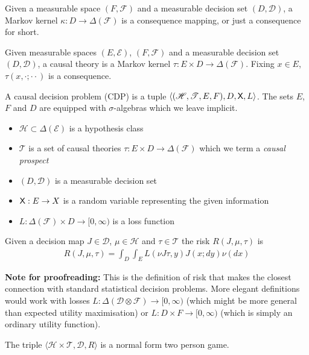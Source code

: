 \begin{definition}[Consequences]
Given a measurable space $(F,\mathcal{F})$ and a measurable decision set $(D,\mathcal{D})$, a Markov kernel $\kappa:D \to \Delta(\mathcal{F})$ is a consequence mapping, or just a consequence for short.
\end{definition}

\begin{definition}\label{def:causal_theory}
Given measurable spaces $(E,\mathcal{E})$, $(F,\mathcal{F})$ and a measurable decision set $(D,\mathcal{D})$, a causal theory is a Markov kernel $\tau:E\times D \to \Delta(\mathcal{F})$. Fixing $x\in E$, $\tau(x,\cdot;\cdot\cdot)$ is a consequence.
\end{definition}

\begin{definition}
A causal decision problem (CDP) is a tuple $\langle (\mathscr{H}, \mathscr{T}, E, F), D, \mathsf{X}, L \rangle$. The sets $E$, $F$ and $D$ are equipped with $\sigma$-algebras which we leave implicit.

\begin{itemize}
    \item $\mathscr{H}\subset \Delta(\mathcal{E})$ is a hypothesis class
    \item $\mathscr{T}$ is a set of causal theories $\tau:E\times D\to \Delta(\mathcal{F})$ which we term a \emph{causal prospect}
    \item $(D,\mathcal{D})$ is a measurable decision set
    \item $\mathsf{X}:E\to X$ is a random variable representing the given information
    \item $L:\Delta(\mathcal{F})\times D\to [0,\infty)$ is a loss function
\end{itemize}

Given a decision map $J\in\mathscr{D}$, $\mu\in \mathscr{H}$ and $\tau\in \mathscr{T}$ the risk $R(J,\mu,\tau)$ is
\begin{align}
    R(J,\mu,\tau) = \int_D\int_E L(\nu J\tau, y) J(x;dy) \nu(dx)
\end{align}

\textbf{Note for proofreading:} This is the definition of risk that makes the closest connection with standard statistical decision problems. More elegant definitions would work with losses $L:\Delta(\mathcal{D}\otimes\mathcal{F})\to [0,\infty)$ (which might be more general than expected utility maximisation) or $L:D\times F\to [0,\infty)$ (which is simply an ordinary utility function).

The triple $\langle \mathscr{H}\times\mathscr{T}, \mathscr{D}, R\rangle$ is a normal form two person game.
\end{definition}

